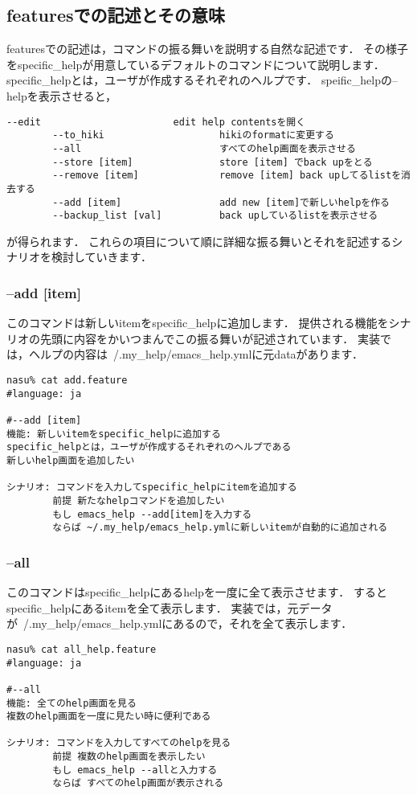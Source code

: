 
\subsection{featuresでの記述とその意味}
featuresでの記述は，コマンドの振る舞いを説明する自然な記述です．
その様子をspecific\_helpが用意しているデフォルトのコマンドについて説明します．
specific\_helpとは，ユーザが作成するそれぞれのヘルプです．
speific\_helpの--helpを表示させると，
\begin{lstlisting}[style=customCsh]
        --edit                       edit help contentsを開く
        --to_hiki                    hikiのformatに変更する
        --all                        すべてのhelp画面を表示させる
        --store [item]               store [item] でback upをとる
        --remove [item]              remove [item] back upしてるlistを消去する
        --add [item]                 add new [item]で新しいhelpを作る
        --backup_list [val]          back upしているlistを表示させる
\end{lstlisting}
が得られます．
これらの項目について順に詳細な振る舞いとそれを記述するシナリオを検討していきます．

\subsubsection{--add [item]}
このコマンドは新しいitemをspecific\_helpに追加します．
提供される機能をシナリオの先頭に内容をかいつまんでこの振る舞いが記述されています．
実装では，ヘルプの内容は~/.my\_help/emacs\_help.ymlに元dataがあります．
\begin{lstlisting}[style=customRuby]
nasu% cat add.feature
#language: ja

#--add [item]
機能: 新しいitemをspecific_helpに追加する
specific_helpとは，ユーザが作成するそれぞれのヘルプである
新しいhelp画面を追加したい

シナリオ: コマンドを入力してspecific_helpにitemを追加する
        前提 新たなhelpコマンドを追加したい
        もし emacs_help --add[item]を入力する
        ならば ~/.my_help/emacs_help.ymlに新しいitemが自動的に追加される

\end{lstlisting}
\subsubsection{--all}
このコマンドはspecific\_helpにあるhelpを一度に全て表示させます．
するとspecific\_helpにあるitemを全て表示します．
実装では，元データが~/.my\_help/emacs\_help.ymlにあるので，それを全て表示します．
\begin{lstlisting}[style=customRuby]
nasu% cat all_help.feature
#language: ja

#--all
機能: 全てのhelp画面を見る
複数のhelp画面を一度に見たい時に便利である

シナリオ: コマンドを入力してすべてのhelpを見る
        前提 複数のhelp画面を表示したい
        もし emacs_help --allと入力する
        ならば すべてのhelp画面が表示される
\end{lstlisting}
